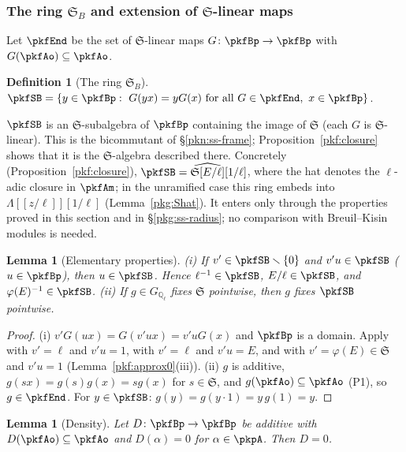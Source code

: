 \documentclass[10pt]{amsart}
\newtheorem{lemma}[theorem]{Lemma}
\theoremstyle{definition}
\newtheorem{definition}[theorem]{Definition}
\theoremstyle{remark}
\newcommand{\Q}{\mathbb Q}
\begin{document}
\subsubsection{The ring $\mathfrak S_B$ and extension of $\mathfrak S$-linear maps}\label{pkf:ss-SB}

Let $\pkfEnd$ be the set of $\mathfrak S$-linear maps $G\colon\pkfBp\to\pkfBp$ with
$G(\pkfAo)\subseteq\pkfAo$.

\begin{definition}[The ring $\mathfrak S_B$]\label{pkf:def-SB}
$\pkfSB=\{y\in\pkfBp:\ G(yx)=yG(x)\text{ for all }G\in\pkfEnd,\ x\in\pkfBp\}$.
\end{definition}

$\pkfSB$ is an $\mathfrak S$-subalgebra of $\pkfBp$ containing the image of $\mathfrak S$ (each $G$ is
$\mathfrak S$-linear). This is the bicommutant of \S\ref{pkn:ss-frame}; Proposition~\ref{pkf:closure}
shows that it is the $\mathfrak S$-algebra described there. Concretely (Proposition~\ref{pkf:closure}),
$\pkfSB=\widehat{\mathfrak S[E/\ell]}[1/\ell]$, where the hat denotes the $\ell$-adic closure in $\pkfAm$;
in the unramified case this ring embeds into $\Lambda[[z/\ell]][1/\ell]$ (Lemma~\ref{pkg:Shat}). It enters
only through the properties proved in this section and in \S\ref{pkg:ss-radius}; no comparison with
Breuil--Kisin modules is needed.

\begin{lemma}[Elementary properties]\label{pkf:SB-basic}
(i) If $v'\in\pkfSB\smallsetminus\{0\}$ and $v'u\in\pkfSB$ ($u\in\pkfBp$), then $u\in\pkfSB$. Hence
$\ell^{-1}\in\pkfSB$, $E/\ell\in\pkfSB$, and $\varphi(E)^{-1}\in\pkfSB$.
(ii) If $g\in G_{\Q_\ell}$ fixes $\mathfrak S$ pointwise, then $g$ fixes $\pkfSB$ pointwise.
\end{lemma}

\begin{proof}
(i) $v'G(ux)=G(v'ux)=v'uG(x)$ and $\pkfBp$ is a domain. Apply with $v'=\ell$ and $v'u=1$, with $v'=\ell$
and $v'u=E$, and with $v'=\varphi(E)\in\mathfrak S$ and $v'u=1$ (Lemma~\ref{pkf:approx0}(iii)).
(ii) $g$ is additive, $g(sx)=g(s)g(x)=sg(x)$ for $s\in\mathfrak S$, and $g(\pkfAo)\subseteq\pkfAo$ (P1),
so $g\in\pkfEnd$. For $y\in\pkfSB$: $g(y)=g(y\cdot1)=y\,g(1)=y$.
\end{proof}

\begin{lemma}[Density]\label{pkf:density}
Let $D\colon\pkfBp\to\pkfBp$ be additive with $D(\pkfAo)\subseteq\pkfAo$ and $D(\alpha)=0$ for
$\alpha\in\pkpA$. Then $D=0$.
\end{lemma}
\end{document}
